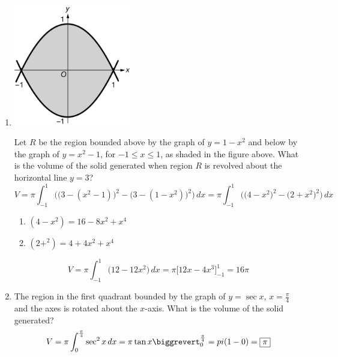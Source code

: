 \documentclass[12pt]{article}
\begin{document}
\begin{enumerate}
    \item 
    \begin{center}
        \includegraphics[width=2in]{4.035.png}
    \end{center}
    Let $R$ be the region bounded above by the graph of $y=1-x^2$ and below by the graph of $y=x^2-1$, for $-1 \leq x \leq 1$, as shaded in the figure above. What is the volume of the solid generated when region $R$ is revolved about the horizontal line $y=3$?
    $$V=\pi\int_{-1}^{1} \biggr(\big(3-(x^2-1)\big)^2-\big(3-(1-x^2)\big)^2\biggr) \, dx = \pi\int_{-1}^{1} \biggr(\big(4-x^2\big)^2-\big(2+x^2\big)^2\biggr) \, dx$$
    \begin{enumerate}
        \item $(4-x^2)=16-8x^2+x^4$
        \item $(2+^2)=4+4x^2+x^4$
    \end{enumerate}
    $$V=\pi\int_{-1}^{1} \bigg(12-12x^2\bigg) \, dx = \pi\biggr[12x-4x^3\biggr]_{-1}^{1} = \boxed{16\pi}$$

    \item The region in the first quadrant bounded by the graph of $y=\sec x$, $x=\frac{\pi}{4}$ and the axes is rotated about the $x$-axis. What is the volume of the solid generated?
    $$V=\pi\int_{0}^{\frac{\pi}{4}} \sec^2 x \, dx = \pi \tan x \biggrevert_{0}^{\frac{\pi}{4}} =pi(1-0) =\boxed{\pi}$$
\end{enumerate}
\end{document}
